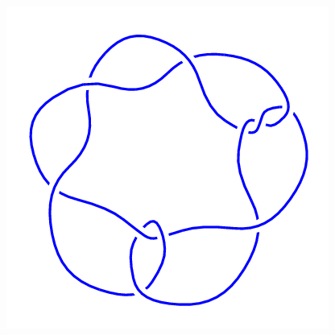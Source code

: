 \begin{figure}[H]
\begin{minipage}[b]{.18\linewidth}
    \end{minipage}
    \begin{minipage}[b]{.18\linewidth}
        \centering
        \includegraphics[width=\linewidth]{../data/10_21.png}
    \end{minipage}
\end{figure}
